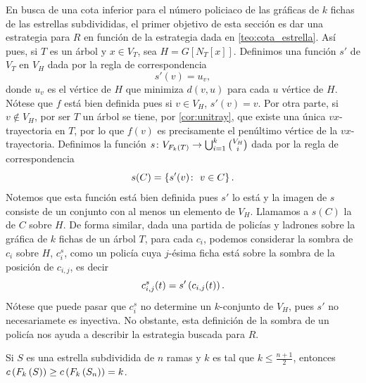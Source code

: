 En busca de una cota inferior para el n\'umero policiaco de las gr\'aficas de
$k$ fichas de las estrellas subdivididas, el primer objetivo de esta secci\'on
es dar una estrategia para $R$ en funci\'on de la estrategia dada en
\cref{teo:cota_estrella}. As\'i pues, si $T$ es un \'arbol y $x\in V_T$, sea
$H=G[N_T[x]]$. Definimos una funci\'on $s'$ de $V_T$ en $V_H$ dada por la regla
de correspondencia
\[
    s'(v) = u_v,
\]
donde $u_v$ es el v\'ertice de $H$ que minimiza $d(v,u)$ para cada $u$ v\'ertice
de $H$. N\'otese que $f$ est\'a bien definida pues si $v\in V_H$, $s'(v) = v$.
Por otra parte, si $v\notin V_H$, por ser $T$ un \'arbol se tiene, por
\cref{cor:unitray}, que existe una \'unica $vx$-trayectoria en $T$, por lo que
$f(v)$ es precisamente el pen\'ultimo v\'ertice de la $vx$-trayectoria.
Definimos la funci\'on $s\colon V_{F_{k}\left( T\right)} \to
\bigcup_{i=1}^{k}\binom{V_H}{i}$ dada por la regla de correspondencia
\[
    s(C) = \left\{ s'(v) \colon\  v\in C\right\}.
\]
Notemos que esta funci\'on est\'a bien definida pues $s'$ lo est\'a y la imagen
de $s$ consiste de un conjunto con al menos un elemento de $V_H$. Llamamos a
$s(C)$ la  de $C$ sobre $H$. De forma similar, dada una partida
de polic\'ias y ladrones sobre la gr\'afica de $k$ fichas de un \'arbol $T$,
para cada $c_i$, podemos considerar la sombra de $c_i$ sobre $H$, $c_i^s$, como
un polic\'ia cuya $j$-\'esima ficha est\'a sobre la sombra de la posici\'on de
$c_{i,j}$, es decir
\[
    c_{i,j}^s(t) = s' \left( c_{i,j}(t)\right).
\]
N\'otese que puede pasar que $c_i^s$ no determine un $k$-conjunto de $V_H$, pues
$s'$ no necesariamete es inyectiva. No obstante, esta definici\'on de la sombra
de un polic\'ia nos ayuda a describir la estrategia buscada para $R$.


\begin{lema}
\label{lem:retracto}
    Si $S$ es una estrella subdividida de $n$ ramas y $k$ es tal que
    $k\leq\frac{n+1}{2}$, entonces $c\left( F_{k}\left( S\right)\right) \geq
    c\left( F_{k}\left( S_n\right)\right)=k$.
\end{lema}

